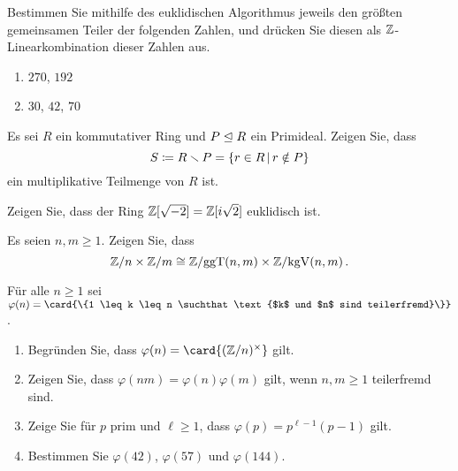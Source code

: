 \documentclass[a4paper, 10pt]{scrartcl}
\begin{document}
\begin{question}
  Bestimmen Sie mithilfe des euklidischen Algorithmus jeweils den größten gemeinsamen Teiler der folgenden Zahlen, und drücken Sie diesen als $\mathbb{Z}$-Linearkombination dieser Zahlen aus.
  \begin{enumerate}
    \item
      $270$, $192$
    \item
      $30$, $42$, $70$
  \end{enumerate}
\end{question}

\begin{question}
  Es sei $R$ ein kommutativer Ring und $P \mathrel{\trianglelefteq} R$ ein Primideal.
  Zeigen Sie, dass
  \[
              S
    \defined  R \smallsetminus P
    =         \{ r \in R \suchthat r \notin P \}
  \]
  ein multiplikative Teilmenge von $R$ ist.
\end{question}

\begin{question}
  Zeigen Sie, dass der Ring $\mathbb{Z}[\sqrt{-2}] = \mathbb{Z}[i\sqrt{2}]$ euklidisch ist.
\end{question}

\begin{question}
  Es seien $n, m \geq 1$.
  Zeigen Sie, dass
  \[
          \mathbb{Z}/n \times \mathbb{Z}/m
    \cong \mathbb{Z}/{\operatorname{ggT}(n,m)} \times \mathbb{Z}/{\operatorname{kgV}(n,m)} \,.
  \]
\end{question}

\begin{question}
  Für alle $n \geq 1$ sei $\varphi(n) = \card{\{1 \leq k \leq n \suchthat \text{$k$ und $n$ sind teilerfremd}\}}$.
  \begin{enumerate}
    \item
      Begründen Sie, dass $\varphi(n) = \card{\unitgroup{(\Integer/n)}}$ gilt.
    \item
      Zeigen Sie, dass $\varphi(nm) = \varphi(n)\varphi(m)$ gilt, wenn $n, m \geq 1$ teilerfremd sind.
    \item
      Zeige Sie für $p$ prim und $\ell \geq 1$, dass $\varphi(p) = p^{\ell-1} (p-1) $ gilt.
    \item
      Bestimmen Sie $\varphi(42)$, $\varphi(57)$ und $\varphi(144)$.
  \end{enumerate}
\end{question}
\end{document}
